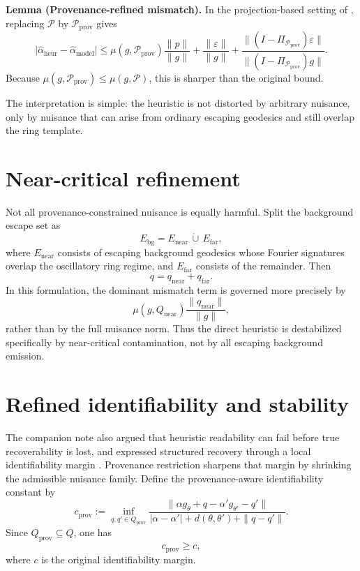\documentclass[10pt,letterpaper,twocolumn]{article}
\begin{document}
\par\smallskip\noindent\textbf{Lemma (Provenance-refined mismatch).} In the projection-based setting of \cite{LandersFourierBHEX}, replacing $\mathcal P$ by $\mathcal P_{\mathrm{prov}}$ gives
\[
\bigl|\hat\alpha_{\mathrm{heur}}-\hat\alpha_{\mathrm{model}}\bigr|
\le
\mu(g,\mathcal P_{\mathrm{prov}})\frac{\|p\|}{\|g\|}
+
\frac{\|\varepsilon\|}{\|g\|}
+
\frac{\|(I-\Pi_{\mathcal P_{\mathrm{prov}}})\varepsilon\|}{\|(I-\Pi_{\mathcal P_{\mathrm{prov}}})g\|}.
\]
Because $\mu(g,\mathcal P_{\mathrm{prov}})\le \mu(g,\mathcal P)$, this is sharper than the original bound.

The interpretation is simple: the heuristic is not distorted by arbitrary nuisance, only by nuisance that can arise from ordinary escaping geodesics and still overlap the ring template.

\section{Near-critical refinement}

Not all provenance-constrained nuisance is equally harmful. Split the background escape set as
\[
E_{\mathrm{bg}} = E_{\mathrm{near}}\,\dot\cup\,E_{\mathrm{far}},
\]
where $E_{\mathrm{near}}$ consists of escaping background geodesics whose Fourier signatures overlap the oscillatory ring regime, and $E_{\mathrm{far}}$ consists of the remainder. Then
\[
q=q_{\mathrm{near}}+q_{\mathrm{far}}.
\]
In this formulation, the dominant mismatch term is governed more precisely by
\[
\mu(g,Q_{\mathrm{near}})\frac{\|q_{\mathrm{near}}\|}{\|g\|},
\]
rather than by the full nuisance norm. Thus the direct heuristic is destabilized specifically by near-critical contamination, not by all escaping background emission.

\section{Refined identifiability and stability}

The companion note also argued that heuristic readability can fail before true recoverability is lost, and expressed structured recovery through a local identifiability margin \cite{LandersFourierBHEX}. Provenance restriction sharpens that margin by shrinking the admissible nuisance family. Define the provenance-aware identifiability constant by
\[
c_{\mathrm{prov}}
:=
\inf_{q,q'\in Q_{\mathrm{prov}}}
\frac{\|\alpha g_\theta + q - \alpha' g_{\theta'} - q'\|}
{|\alpha-\alpha'| + d(\theta,\theta') + \|q-q'\|}.
\]
Since $Q_{\mathrm{prov}}\subseteq Q$, one has
\[
c_{\mathrm{prov}}\ge c,
\]
where $c$ is the original identifiability margin.
\end{document}
